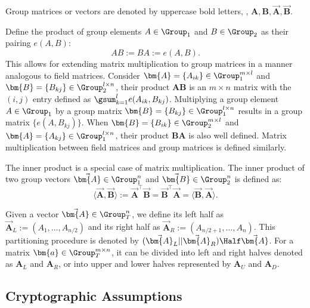 Group matrices or vectors are denoted by uppercase bold letters, \eg, $\bm{A}, \bm{B}, \vec{\bm{A}}, \vec{\bm{B}}$.

Define the product of group elements $A \in \Group_1$ and $B \in \Group_2$ as their pairing $e(A, B)$:
\[
	AB := BA := e(A, B).
\]
This allows for extending matrix multiplication to group matrices in a manner analogous to field matrices.
Consider $\bm{A} = \{ A_{ik}\} \in \Group_1^{m\times l}$ and $\bm{B} = \{ B_{kj}\} \in \Group_2^{l \times n}$, their product $\bm{A} \bm{B}$ is an $m\times n$ matrix with the $(i, j)$ entry defined as 
$\gsum_{k = 1}^l e(A_{ik}, B_{kj})
$.
Multiplying a group element $A \in \Group_1$ by a group matrix $\bm{B} = \{ B_{kj}\} \in \Group_1^{l \times n}$ results in a group matrix $\{ e(A, B_{kj}) \} $.
When $\bm{B} = \{ B_{ik}\} \in \Group_2^{m \times l}$ and $\bm{A} = \{ A_{kj}\} \in \Group_1^{l \times n}$, their product $\bm{B}\bm{A}$ is also well defined.
Matrix multiplication between field matrices and group matrices is defined similarly.


The inner product is a special case of matrix multiplication.
The inner product of two group vectors $\vec{\bm{A}} \in \Group_1^n$ and $\vec{\bm{B}} \in \Group_2^n$ is defined as:
\[
	\langle \vec{\bm{A}}, \vec{\bm{B}} \rangle :=
	\vec{\bm{A}}^\top \vec{\bm{B}} = 
	\vec{\bm{B}}^\top \vec{\bm{A}} = 
	\langle \vec{\bm{B}}, \vec{\bm{A}} \rangle .
\]


Given a vector $\vec{\bm{A}} \in \Group_T^n$, we define its left half as 
$\vec{\bm{A}}_L := (A_1, \ldots, A_{n/2})$ and its right half as 
$\vec{\bm{A}}_R := (A_{n/2 + 1}, \ldots, A_{n})$.
This partitioning procedure is denoted by
$(\vec{\bm{A}}_L || \vec{\bm{A}}_R) \Half \vec{\bm{A}}$.
For a matrix $\bm{a} \in \Group_T^{m\times n}$, it can be divided into left and right halves denoted as $\bm{A}_L$ and $\bm{A}_R$,
or into upper and lower halves represented by $\bm{A}_U$ and $\bm{A}_D$.


\subsection{Cryptographic Assumptions}
\label{appx:assumptions}

